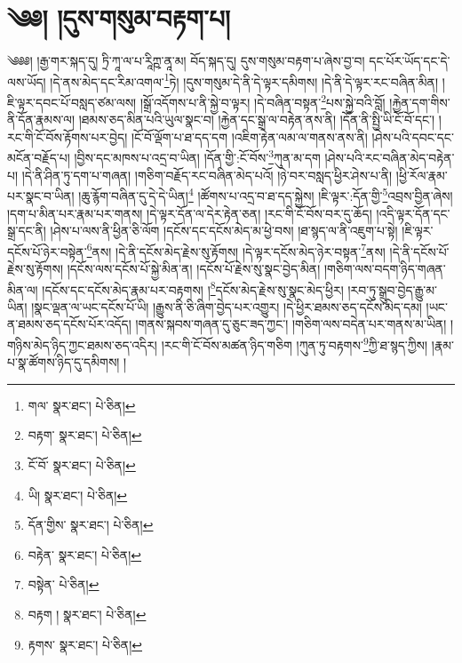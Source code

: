 \setcounter{footnote}{0} 
\chapter{༄༅། །དུས་གསུམ་བརྟག་པ།}༄༅༅། །རྒྱ་གར་སྐད་དུ། ཏྲི་ཀཱ་ལ་པ་རཱིཀྵ་ནཱ་མ། བོད་སྐད་དུ། དུས་གསུམ་བརྟག་པ་ཞེས་བྱ་བ། དང་པོར་ཡོད་དང་དེ་ལས་ཡོད། །དེ་ནས་མེད་དང་རིམ་འགལ་\footnote{གལ་  སྣར་ཐང་།  པེ་ཅིན། }ཏེ། །དུས་གསུམ་དེ་ནི་དེ་ལྟར་དམིགས། །དེ་ནི་དེ་ལྟར་རང་བཞིན་མིན། །ཇི་ལྟར་དབང་པོ་བསླད་ཙམ་ལས། །སྒྲོ་འདོགས་པ་ནི་སྐྱེ་བ་ལྟར། །དེ་བཞིན་བསྟན་\footnote{བརྟག་  སྣར་ཐང་།  པེ་ཅིན། }པས་སྐྱེ་བའི་བློ། །རྐྱེན་དག་གིས་ནི་དོན་རྣམས་ལ། །ཐམས་ཅད་མིན་པའི་ཡུལ་སྣང་བ། །རྐྱེན་དང་སྒྲ་ལ་བརྟེན་ནས་ནི། །དོན་ནི་སྤྱི་ཡི་ངོ་བོ་དང་། །རང་གི་ངོ་བོས་རྟོགས་པར་བྱེད། །ངོ་བོ་ལྡོག་པ་ཐ་དད་དག །འཇིག་རྟེན་ལམ་ལ་གནས་ནས་ནི། །ཤེས་པའི་དབང་དང་མངོན་བརྗོད་པ། །བྱིས་དང་མཁས་པ་འདྲ་བ་ཡིན། །དོན་གྱི་:ངོ་བོས་\footnote{ངོ་བོ་  སྣར་ཐང་།  པེ་ཅིན། }ཀུན་མ་དག །ཤེས་པའི་རང་བཞིན་མེད་བརྟེན་པ། །དེ་ནི་ཤིན་ཏུ་དག་པ་གཞན། །གཅིག་བརྗོད་རང་བཞིན་མེད་པའོ། །ཉེ་བར་བསླད་ཕྱིར་ཤེས་པ་ནི། །ཕྱི་རོལ་རྣམ་པར་སྣང་བ་ཡིན། །ཆུ་རྙོག་བཞིན་དུ་དེ་དེ་ཡིན།\footnote{ཡི།  སྣར་ཐང་།  པེ་ཅིན། } །ཚོགས་པ་འདྲ་བ་ཐ་དད་སྐྱེས། །ཇི་ལྟར་:དོན་གྱི་\footnote{དོན་གྱིས་  སྣར་ཐང་།  པེ་ཅིན། }འབྲས་བྱིན་ཞེས། །དག་པ་མིན་པར་རྣམ་པར་གནས། །དེ་ལྟར་དོན་ལ་དེར་རྟེན་ཅན། །རང་གི་ངོ་བོས་བར་དུ་ཆོད། །འདི་ལྟར་དོན་དང་སྒྲ་དང་ནི། །ཤེས་པ་ལས་ནི་ཕྱིན་ཅི་ལོག །དངོས་དང་དངོས་མེད་མ་ཕྱེ་བས། །ཐ་སྙད་ལ་ནི་འཇུག་པ་སྟེ། །ཇི་ལྟར་དངོས་པོ་ཉེར་བསྟེན་\footnote{བརྟེན་  སྣར་ཐང་།  པེ་ཅིན། }ནས། །དེ་ནི་དངོས་མེད་རྗེས་སུ་རྟོགས། །དེ་ལྟར་དངོས་མེད་ཉེར་བསྟན་\footnote{བསྟེན་  པེ་ཅིན། }ནས། །དེ་ནི་དངོས་པོ་རྗེས་སུ་རྟོགས། །དངོས་ལས་དངོས་པོ་སྐྱེ་མིན་ན། །དངོས་པོ་རྗེས་སུ་སྣང་བྱེད་མིན། །གཅིག་ལས་བདག་ཉིད་གཞན་མིན་ལ། །དངོས་དང་དངོས་མེད་རྣམ་པར་བརྟགས། །\footnote{བརྟག །  སྣར་ཐང་།  པེ་ཅིན། }དངོས་མེད་རྗེས་སུ་སྣང་མེད་ཕྱིར། །རབ་ཏུ་སྒྲུབ་བྱེད་རྒྱུ་མ་ཡིན། །སྣང་ལྡན་ལ་ཡང་དངོས་པོ་ཡི། །རྒྱུས་ནི་ཅི་ཞིག་བྱེད་པར་འགྱུར། །དེ་ཕྱིར་ཐམས་ཅད་དངོས་མེད་དམ། །ཡང་ན་ཐམས་ཅད་དངོས་པོར་འདོད། །གནས་སྐབས་གཞན་དུ་ཅུང་ཟད་ཀྱང་། །གཅིག་ལས་བདེན་པར་གནས་མ་ཡིན། །གཉིས་མེད་ཉིད་ཀྱང་ཐམས་ཅད་འདིར། །རང་གི་ངོ་བོས་མཚན་ཉིད་གཅིག །ཀུན་ཏུ་བརྟགས་\footnote{རྟགས་  སྣར་ཐང་།  པེ་ཅིན། }ཀྱི་ཐ་སྙད་ཀྱིས། །རྣམ་པ་སྣ་ཚོགས་ཉིད་དུ་དམིགས། །

